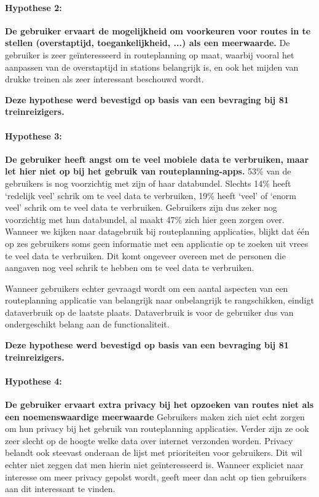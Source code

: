 \paragraph{Hypothese 2:}\textbf{De gebruiker ervaart de mogelijkheid om voorkeuren voor routes in te stellen (overstaptijd, toegankelijkheid, ...) als een meerwaarde.}
	De gebruiker is zeer geïnteresseerd in routeplanning op maat, waarbij vooral het aanpassen van de overstaptijd in stations belangrijk is, en ook het mijden van drukke treinen als zeer interessant beschouwd wordt.

\textbf{Deze hypothese werd bevestigd op basis van een bevraging bij 81 treinreizigers.}

\paragraph{Hypothese 3:}\textbf{ De gebruiker heeft angst om te veel mobiele data te verbruiken, maar let hier niet op bij het gebruik van routeplanning-apps.}
    53\% van de gebruikers is nog voorzichtig met zijn of haar databundel. Slechts 14\% heeft `redelijk veel' schrik om te veel data te verbruiken, 19\% heeft `veel' of `enorm veel' schrik om te veel data te verbruiken. Gebruikers zijn dus zeker nog voorzichtig met hun databundel, al maakt 47\% zich hier geen zorgen over.
    Wanneer we kijken naar datagebruik bij routeplanning applicaties, blijkt dat één op zes gebruikers soms geen informatie met een applicatie op te zoeken uit vrees te veel data te verbruiken. Dit komt ongeveer overeen met de personen die aangaven nog veel schrik te hebben om te veel data te verbruiken.
    
    Wanneer gebruikers echter gevraagd wordt om een aantal aspecten van een routeplanning applicatie van belangrijk naar onbelangrijk te rangschikken, eindigt dataverbruik op de laatste plaats. Dataverbruik is voor de gebruiker dus van ondergeschikt belang aan de functionaliteit.
    
\textbf{Deze hypothese werd bevestigd op basis van een bevraging bij 81 treinreizigers.}

\paragraph{Hypothese 4:}\textbf{De gebruiker ervaart extra privacy bij het opzoeken van routes niet als een noemenswaardige meerwaarde}
	Gebruikers maken zich niet echt zorgen om hun privacy bij het gebruik van routeplanning applicaties. Verder zijn ze ook zeer slecht op de hoogte welke data over internet verzonden worden. Privacy belandt ook steevast onderaan de lijst met prioriteiten voor gebruikers. Dit wil echter niet zeggen dat men hierin niet geïnteresseerd is. Wanneer expliciet naar interesse om meer privacy gepolst wordt, geeft meer dan acht op tien gebruikers aan dit interessant te vinden.
	
